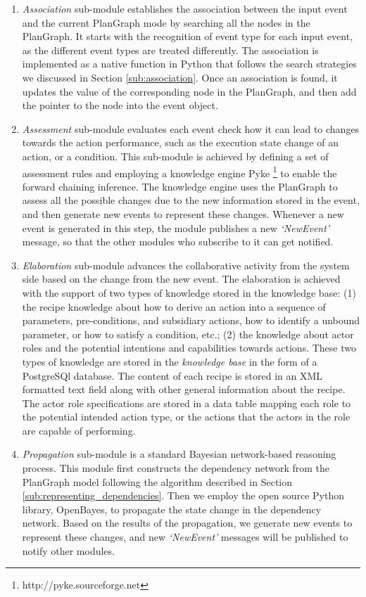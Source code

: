 \begin{enumerate}
	\item \emph{Association} sub-module establishes the association between the input event and the current PlanGraph mode by searching all the nodes in the PlanGraph. It starts with the recognition of event type for each input event, as the different event types are treated differently. The association is implemented as a native function in Python that follows the search strategies we discussed in Section \ref{sub:association}. Once an association is found, it updates the value of the corresponding node in the PlanGraph, and then add the pointer to the node into the event object.
	\item \emph{Assessment} sub-module evaluates each event check how it can lead to changes towards the action performance, such as the execution state change of an action, or a condition. This sub-module is achieved by defining a set of assessment rules and employing a knowledge engine Pyke \footnote{http://pyke.sourceforge.net} to enable the forward chaining inference. The knowledge engine uses the PlanGraph to assess all the possible changes due to the new information stored in the event, and then generate new events to represent these changes. Whenever a new event is generated in this step, the module publishes a new \emph{`NewEvent'} message, so that the other modules who subscribe to it can get notified.
	\item \emph{Elaboration} sub-module advances the collaborative activity from the system side based on the change from the new event. The elaboration is achieved with the support of two types of knowledge stored in the knowledge base: (1) the recipe knowledge about how to derive an action into a sequence of parameters, pre-conditions, and subsidiary actions, how to identify a unbound parameter, or how to satisfy a condition, etc.; (2) the knowledge about actor roles and the potential intentions and capabilities towards actions. These two types of knowledge are stored in the \emph{knowledge base} in the form of a PostgreSQl database. The content of each recipe is stored in an XML formatted text field along with other general information about the recipe. The actor role specifications are stored in a data table mapping each role to the potential intended action type, or the actions that the actors in the role are capable of performing.
	\item \emph{Propagation} sub-module is a standard Bayesian network-based reasoning process. This module first constructs the dependency network from the PlanGraph model following the algorithm described in Section \ref{sub:representing_dependencies}. Then we employ the open source Python library, OpenBayes, to propagate the state change in the dependency network. Based on the results of the propagation, we generate new events to represent these changes, and new \emph{`NewEvent'} messages will be published to notify other modules.
\end{enumerate}

